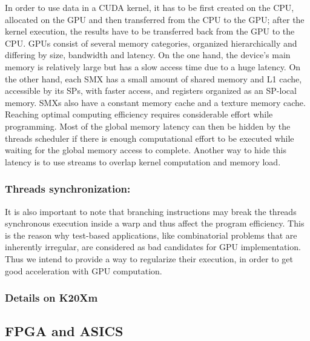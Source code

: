 In order to use data in a CUDA kernel, it has to be first created on the CPU, allocated on the GPU and then transferred from the CPU to the GPU; after the kernel execution, the results have to be transferred back from the GPU to the CPU. 
GPUs consist of several memory categories, organized hierarchically and differing by size, bandwidth and latency.   
On the one hand, the device's main memory is relatively large but has a slow access time due to a huge latency. 
On the other hand, each SMX has a small amount of shared memory and L1 cache, accessible by its SPs, with faster access, and registers organized as an SP-local memory. 
SMXs also have a constant memory cache and a texture memory cache.
Reaching optimal computing efficiency requires considerable effort while programming.
Most of the global memory latency can then be hidden by the threads scheduler if there is enough computational effort to be executed while waiting for the global memory access to complete. Another way to hide this latency is to use streams to overlap kernel computation and memory load. 

\subsubsection{Threads synchronization:}
It is also important to note that branching instructions may break the threads synchronous execution inside a warp and thus affect the program efficiency. 
This is the reason why test-based applications, like combinatorial problems that are inherently irregular, are considered as bad candidates for GPU implementation. 
Thus we intend to provide a way to regularize their execution, in order to get good acceleration with GPU computation. 

\subsubsection{Details on K20Xm}


\subsection{FPGA and ASICS}

